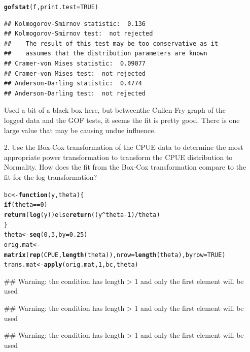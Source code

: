\documentclass{article}\usepackage{graphicx, color}
\makeatletter
\newcommand{\hlfunctioncall}[1]{\textcolor[rgb]{0.501960784313725,0,0.329411764705882}{\textbf{#1}}}%
\newenvironment{kframe}{%
 \def\at@end@of@kframe{}%
 \ifinner\ifhmode%
  \def\at@end@of@kframe{\end{minipage}}%
  \begin{minipage}{\columnwidth}%
 \fi\fi%
 \def\FrameCommand##1{\hskip\@totalleftmargin \hskip-\fboxsep
 \colorbox{shadecolor}{##1}\hskip-\fboxsep
     \hskip-\linewidth \hskip-\@totalleftmargin \hskip\columnwidth}%
 \MakeFramed {\advance\hsize-\width
   \@totalleftmargin\z@ \linewidth\hsize
   \@setminipage}}%
 {\par\unskip\endMakeFramed%
 \at@end@of@kframe}
\newenvironment{knitrout}{}{} %
\makeatother
\begin{document}
\begin{enumerate}
\begin{shaded}
\begin{knitrout}
{}

\begin{kframe}\begin{alltt}
\hlfunctioncall{gofstat}(f, print.test = TRUE)
\end{alltt}
\begin{verbatim}
## Kolmogorov-Smirnov statistic:  0.136 
## Kolmogorov-Smirnov test:  not rejected 
##    The result of this test may be too conservative as it  
##    assumes that the distribution parameters are known
## Cramer-von Mises statistic:  0.09077 
## Cramer-von Mises test:  not rejected 
## Anderson-Darling statistic:  0.4774 
## Anderson-Darling test:  not rejected
\end{verbatim}
\end{kframe}
\end{knitrout}

Used a bit of a black box here, but betweenthe Cullen-Fry graph of the logged data 
and the GOF tests, it seems the fit is pretty good.  There is one large value that
may be causing undue influence.
\end{shaded}
\item[2.] Use the Box-Cox transformation of the CPUE data to
  determine the most appropriate power transformation to transform
  the CPUE distribution to Normality. How does the fit from the Box-Cox transformation compare to the fit for the log transformation?
\begin{shaded}
\begin{knitrout}
\color{fgcolor}\begin{kframe}
\begin{alltt}
bc <- \hlfunctioncall{function}(y, theta) \{
    \hlfunctioncall{if} (theta == 0) 
        \hlfunctioncall{return}(\hlfunctioncall{log}(y)) else \hlfunctioncall{return}((y^theta - 1)/theta)
\}
theta <- \hlfunctioncall{seq}(0, 3, by = 0.25)
orig.mat <- \hlfunctioncall{matrix}(\hlfunctioncall{rep}(CPUE, \hlfunctioncall{length}(theta)), nrow = \hlfunctioncall{length}(theta), byrow = TRUE)
trans.mat <- \hlfunctioncall{apply}(orig.mat, 1, bc, theta)
\end{alltt}


{\ttfamily\noindent\textcolor{warningcolor}{\#\# Warning: the condition has length > 1 and only the first element will be used}}

{\ttfamily\noindent\textcolor{warningcolor}{\#\# Warning: the condition has length > 1 and only the first element will be used}}

{\ttfamily\noindent\textcolor{warningcolor}{\#\# Warning: the condition has length > 1 and only the first element will be used}}


\end{kframe}
\end{knitrout}
\end{shaded}
\end{enumerate}
\end{document}
